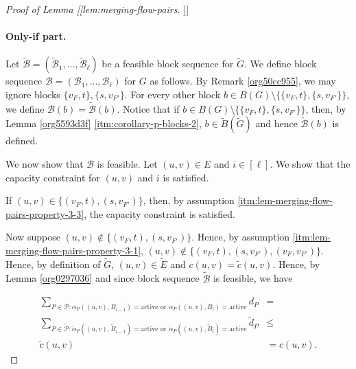 \documentclass[fontsize=11pt,paper=a4]{book}
\begin{document}
\begin{proof}[Proof of Lemma [[lem:merging-flow-pairs]]]
\paragraph{Only-if part.}
Let \(\tilde{\mathcal{B}}=(\tilde{\mathscr{B}}_1,\dots,\tilde{\mathscr{B}}_{\ell})\) be a feasible block sequence for \(\tilde{G}\).
We define block sequence \(\mathcal{B}=(\mathscr{B}_1,\dots,\mathscr{B}_{\ell})\) for \(G\) as follows.
By Remark \ref{org50cc955}, we may ignore blocks \(\{v_F,t\},\{s,v_{F'}\}\).
For every other block \(b\in B(G)\setminus\{\{v_F,t\},\{s,v_{F'}\}\}\), we define \(\mathcal{B}(b)=\tilde{\mathcal{B}}(b)\).
Notice that if \(b\in B(G)\setminus\{\{v_F,t\},\{s,v_{F'}\}\}\), then, by Lemma \ref{org5593d3f} \ref{itm:corollary-p-blocks-2}, \(b\in\tilde{B}(\tilde{G})\) and hence \(\tilde{\mathcal{B}}(b)\) is defined.

We now show that \(\mathcal{B}\) is feasible.
Let \((u,v)\in E\) and \(i\in[\ell]\).
We show that the capacity constraint for \((u,v)\) and \(i\) is satisfied.

If \((u,v)\in\{(v_F,t),(s,v_{F'})\}\), then, by assumption \ref{itm:lem-merging-flow-pairs-property-3-3}, the capacity constraint is satisfied.

Now suppose \((u,v)\notin\{(v_F,t),(s,v_{F'})\}\).
Hence, by assumption \ref{itm:lem-merging-flow-pairs-property-3-1}, \((u,v)\notin\{(v_F,t),(s,v_{F'}),(v_F,v_{F'})\}\).
Hence, by definition of \(\tilde{G}\), \((u,v)\in\tilde{E}\) and \(c(u,v)=\tilde{c}(u,v)\).
Hence, by Lemma \ref{org0297036} and since block sequence \(\tilde{\mathcal{B}}\) is feasible, we have

\begin{align*}
\sum_{P\in\mathcal{P}:\alpha_P((u,v),B_{i-1})=\mathrm{active}\text{ or }\alpha_P((u,v),B_i)=\mathrm{active}}d_P&=\\
\sum_{P\in\tilde{\mathcal{P}}:\tilde{\alpha}_P((u,v),\tilde{B}_{i-1})=\mathrm{active}\text{ or }\tilde{\alpha}_P((u,v),\tilde{B}_i)=\mathrm{active}}\tilde{d}_P&\leq\\
\tilde{c}(u,v)&=
c(u,v).
\end{align*}
\end{proof}
\end{document}
